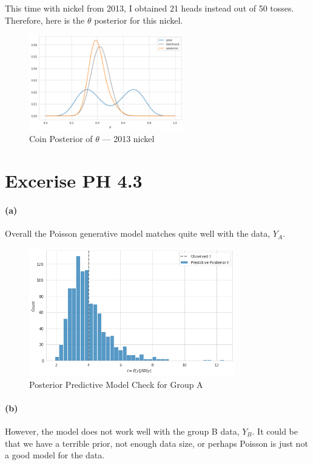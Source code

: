 \documentclass[11pt, letterpaper]{article}
\begin{document}
\vspace{0.15in}

This time with nickel from 2013, I obtained 21 heads instead out of 50 tosses. Therefore, here is the
$\theta$ posterior for this nickel.

\begin{figure}[!h]
  \centering
  \includegraphics[width=0.6\textwidth]{3.8.d.png}
  \captionsetup{justification=centering}
  \caption{Coin Posterior of $\theta$ --- 2013 nickel}
\end{figure}

\newpage


\section{Excerise PH 4.3}
\paragraph{(a)}
Overall the Poisson generative model matches quite well with the data, $Y_A$. 

\begin{figure}[!h]
  \centering
  \includegraphics[width=0.8\textwidth]{4.3.a.png}
  \captionsetup{justification=centering}
  \caption{Posterior Predictive Model Check for Group A}
\end{figure}

\paragraph{(b)}
However, the model does not work well with the group B data, $Y_B$. It could be that we have a terrible prior,
not enough data size, or perhaps Poisson is just not a good model for the data.
\end{document}
